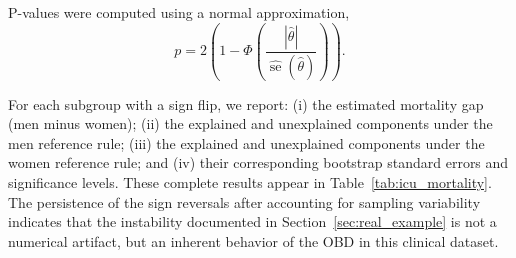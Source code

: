P-values were computed using a normal approximation,
\[
    p = 2\left(1 - \Phi\left(\frac{|\hat\theta|}{\widehat{\operatorname{se}}(\hat\theta)}\right)\right).
\]

For each subgroup with a sign flip, we report:  
(i) the estimated mortality gap (men minus women);  
(ii) the explained and unexplained components under the men reference rule;  
(iii) the explained and unexplained components under the women reference rule; and  
(iv) their corresponding bootstrap standard errors and significance levels.  
These complete results appear in Table~\ref{tab:icu_mortality}. The persistence of the sign reversals after accounting for sampling variability indicates that the instability documented in Section~\ref{sec:real_example} is not a numerical artifact, but an inherent behavior of the OBD in this clinical dataset.


